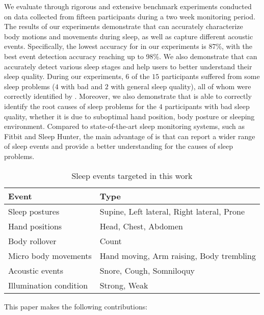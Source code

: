 We evaluate {\systemname} through rigorous and extensive benchmark experiments conducted on data collected from fifteen participants during a two week monitoring period. The results of our experiments demonstrate that {\systemname} can accurately characterize body motions and movements during sleep, as well as capture different acoustic events. Specifically, the lowest accuracy for {\systemname} in our experiments is 87\%, with the best event detection accuracy reaching up to 98\%. We also demonstrate that {\systemname} can accurately detect various sleep stages and help users to better understand their sleep quality. During our experiments, $6$ of the $15$ participants suffered from some sleep problems ($4$ with bad and $2$ with general sleep quality), all of whom were correctly identified by {\systemname}. Moreover, we also demonstrate that {\systemname} is able to correctly identify the root causes of sleep problems for the $4$ participants with bad sleep quality, whether it is due to suboptimal hand position, body posture or sleeping environment. Compared to state-of-the-art sleep monitoring systems, such as Fitbit and Sleep Hunter, the main advantage of {\systemname} is that can report a wider range of sleep events and provide a better understanding for the causes of sleep problems.

\begin{table}[!t]
 \caption{\label{tab:test}Sleep events targeted in this work}
 \centering
 \begin{tabular}{ll}
  \toprule
  \textbf{Event}& \textbf{Type} \\
  \midrule
\rowcolor{Gray}  Sleep postures & Supine, Left lateral, Right lateral, Prone\\
 Hand positions & Head, Chest, Abdomen\\
\rowcolor{Gray} Body rollover & Count\\
 Micro body movements& Hand moving, Arm raising, Body trembling \\
\rowcolor{Gray} Acoustic events & Snore, Cough, Somniloquy  \\
 Illumination condition & Strong, Weak  \\
  \bottomrule
 \end{tabular}
\end{table}


This paper makes the following contributions:

